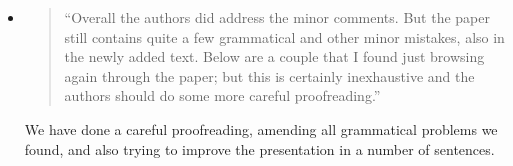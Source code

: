 
\begin{itemize}


\item \begin{quote}
``Overall the authors did address the minor comments. But the paper
still contains quite a few grammatical and other minor mistakes, also
in the newly added text. Below are a couple that I found just browsing
again through the paper; but this is certainly inexhaustive and the
authors should do some more careful proofreading.''
\end{quote}
\Mark
 We have done a  careful proofreading,   amending all 
grammatical problems we found, and also trying to improve the
presentation in a number of sentences. 


\end{itemize}
